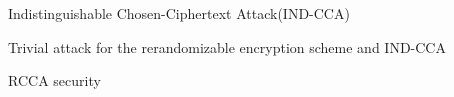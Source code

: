 \begin{frame}{Indistinguishable Chosen-Ciphertext Attack(IND-CCA)}

\end{frame}

\begin{frame}{Trivial attack for the rerandomizable encryption scheme and IND-CCA}

\end{frame}

\begin{frame}{RCCA security}

\end{frame}
